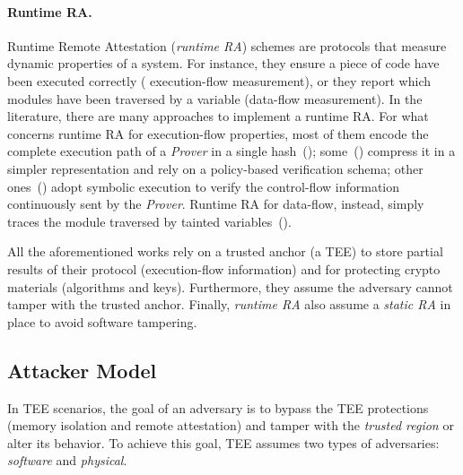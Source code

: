 \paragraph{Runtime RA.}


Runtime Remote Attestation (\emph{runtime RA}) schemes are protocols that 
measure dynamic properties of a system.
For instance, they ensure a piece of code have been executed correctly (\ie 
execution-flow measurement), or they report which modules have been traversed 
by a variable (\ie data-flow measurement).
In the literature, there are many approaches to implement a runtime RA.
For what concerns runtime RA for execution-flow properties, most of them encode 
the complete execution path of a \emph{Prover} in a single 
hash~(\cite{abera2016c,zeitouni2017atrium,dessouky2017fat}); 
some~(\cite{aberadiat}) compress it in a simpler representation and rely on a 
policy-based verification schema; 
other ones~(\cite{Dessouky:2018:LLH:3240765.3240821}) adopt symbolic execution 
to verify the control-flow information continuously sent by the \emph{Prover}.
Runtime RA for data-flow, instead, simply traces the module traversed by 
tainted variables~(\cite{apex,aberadiat}).

All the aforementioned works rely on a trusted anchor (\eg a TEE) to store 
partial results of their protocol (\eg execution-flow information) and for 
protecting crypto materials (\ie algorithms and keys).
Furthermore, they assume the adversary cannot tamper with the trusted anchor.
Finally, \emph{runtime RA} also assume a \emph{static RA} in place to avoid 
software tampering.

\subsection{Attacker Model}
\label{ssec:attacker-model}

In TEE scenarios, the goal of an adversary is to bypass the TEE protections 
(\ie memory isolation and remote attestation) and tamper with the \emph{trusted 
region} or alter its behavior.
To achieve this goal, TEE assumes two types of adversaries: \emph{software} and 
\emph{physical}.

